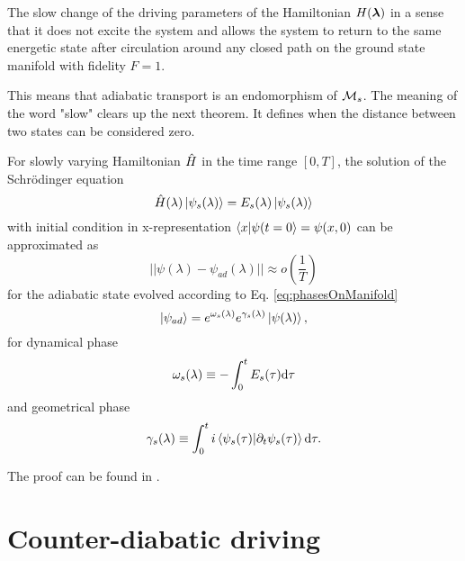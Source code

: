 \begin{definition}[Adibaticity]
    The slow change of the driving parameters of the Hamiltonian $H({\bm\lambda})$ in a sense that it does not excite the system and allows the system to return to the same energetic state after circulation around any closed path on the ground state manifold with fidelity $F=1$. 
\end{definition}
This means that adiabatic transport is an endomorphism of $\mathcal{M} _s$. The meaning of the word "slow" clears up the next theorem. It defines when the distance between two states can be considered zero.
\begin{thm}
    \label{adiabaticTheorem}
    For slowly varying Hamiltonian $\hat{H}$ in the time range $[0,T]$, the solution of the Schrödinger equation 
    $$\hat{H}(\lambda)\ket{\psi_s(\lambda)} = E_s(\lambda)\ket{\psi_s(\lambda)}$$
    with initial condition in x-representation $\braket{x|\psi(t=0}=\psi(x,0)$ can be approximated as
    \begin{equation}
      ||\psi(\lambda) - \psi_{ad}(\lambda)||\approx o\left(\frac{1}{T}\right)
    \end{equation}
    for the adiabatic state evolved according to Eq. \ref{eq:phasesOnManifold}
    \begin{equation}
        \ket{\psi_{ad}}= e^{\omega_s(\lambda)}e^{\gamma_s(\lambda)}\ket{\psi(\lambda)},
    \end{equation}
    for dynamical phase
    $$\omega_s(\lambda)\equiv -\int_0^t E_s(\tau)\mathrm{d} \tau$$
    and geometrical phase
        $$\gamma_s(\lambda)\equiv \int_0^t i\braket{\psi_s(\tau)|\partial_t\psi_s(\tau)} \mathrm{d} \tau .$$
\end{thm}
\begin{myproof}
    The proof can be found in \citet[Chap. 6]{sakurai}.
\end{myproof}














\section{Counter-diabatic driving}


